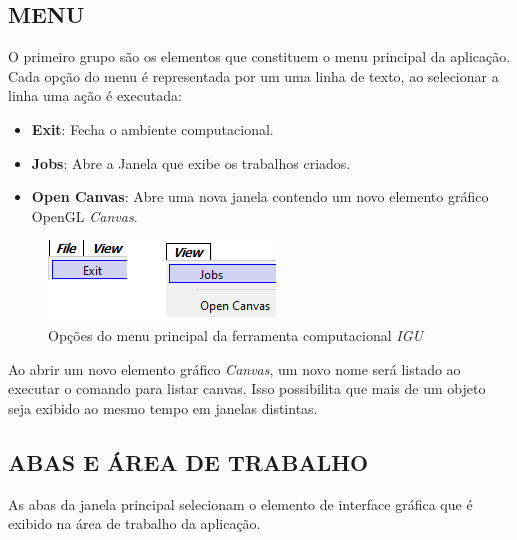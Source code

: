 \subsection{MENU}\label{sec:menu}

O primeiro grupo são os elementos que constituem o menu principal da aplicação. Cada opção do menu é representada por um uma linha de texto, ao selecionar a linha uma ação é executada:

\begin{itemize}
	\item \textbf{Exit}: Fecha o ambiente computacional.
	\item \textbf{Jobs}: Abre a Janela que exibe os trabalhos criados.
	\item \textbf{Open Canvas}: Abre uma nova janela contendo um novo elemento gráfico OpenGL \textit{Canvas}.
\end{itemize}

\begin{figure}[!htbp]
\centering
\includegraphics[scale=1]{Figures/IGU_016.png}
\caption{Opções do menu principal da ferramenta computacional \textit{IGU}}
\label{fig:menu}
\end{figure}

Ao abrir um novo elemento gráfico \textit{Canvas}, um novo nome será listado ao executar o comando para listar canvas. Isso possibilita que mais de um objeto seja exibido ao mesmo tempo em janelas distintas.

\subsection{ABAS E ÁREA DE TRABALHO}\label{sec:abas}

As abas da janela principal selecionam o elemento de interface gráfica que é exibido na área de trabalho da aplicação.

